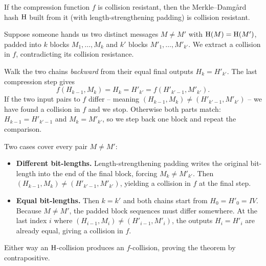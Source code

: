 \begin{theorem}
\label{ch14:md-thm}
If the compression function $f$ is collision resistant, then the Merkle--Damg\aa{}rd hash $\operatorname{H}$ built from it (with length-strengthening padding) is collision resistant.
\end{theorem}

\begin{whybox}
Suppose someone hands us two distinct messages $M \ne M'$ with $\operatorname{H}(M) = \operatorname{H}(M')$, padded into $k$ blocks $M_1, \dots, M_k$ and $k'$ blocks $M'_1, \dots, M'_{k'}$. We extract a collision in $f$, contradicting its collision resistance.

Walk the two chains \emph{backward} from their equal final outputs $H_k = H'_{k'}$. The last compression step gives
\[
  f(H_{k-1}, M_k) = H_k = H'_{k'} = f(H'_{k'-1}, M'_{k'}).
\]
If the two input pairs to $f$ differ -- meaning $(H_{k-1}, M_k) \ne (H'_{k'-1}, M'_{k'})$ -- we have found a collision in $f$ and we stop. Otherwise both parts match: $H_{k-1} = H'_{k'-1}$ and $M_k = M'_{k'}$, so we step back one block and repeat the comparison.

Two cases cover every pair $M \ne M'$:
\begin{itemize}
  \item \textbf{Different bit-lengths.} Length-strengthening padding writes the original bit-length into the end of the final block, forcing $M_k \ne M'_{k'}$. Then $(H_{k-1}, M_k) \ne (H'_{k'-1}, M'_{k'})$, yielding a collision in $f$ at the final step.
  \item \textbf{Equal bit-lengths.} Then $k = k'$ and both chains start from $H_0 = H'_0 = \mathit{IV}$. Because $M \ne M'$, the padded block sequences must differ somewhere. At the last index $i$ where $(H_{i-1}, M_i) \ne (H'_{i-1}, M'_i)$, the outputs $H_i = H'_i$ are already equal, giving a collision in $f$.
\end{itemize}
Either way an $\operatorname{H}$-collision produces an $f$-collision, proving the theorem by contrapositive.
\end{whybox}

